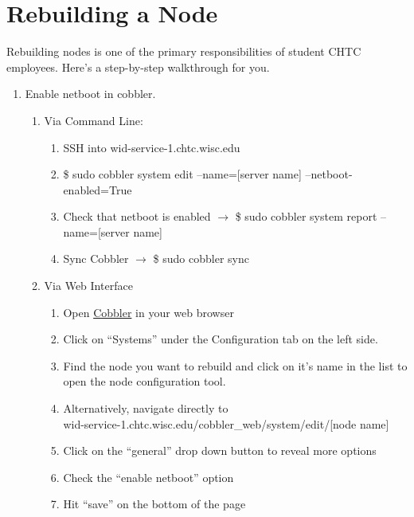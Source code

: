 \documentclass[10pt,letterpaper]{article}
\begin{document}
\clearpage

\section{Rebuilding a Node}
    Rebuilding nodes is one of the primary responsibilities of student CHTC employees.
    Here’s a step-by-step walkthrough for you.

    \begin{enumerate}
        \item Enable netboot in cobbler.
        \begin{enumerate}
            \item Via Command Line:
            \begin{enumerate}
                \item SSH into wid-service-1.chtc.wisc.edu
                \item {\selectfont \$ sudo cobbler system edit
                --name=[server name] --netboot-enabled=True }
                \item Check that netboot is enabled $\rightarrow$
                {\selectfont \$ sudo cobbler system report
                --name=[server name] }
                \item Sync Cobbler $\rightarrow$ {\selectfont
                \$ sudo cobbler sync }
            \end{enumerate}
            \item Via Web Interface
            \begin{enumerate}
                \item Open \href{https://wid-service-1.chtc.wisc.edu/cobbler_web}{Cobbler}
                in your web browser
                \item Click on “Systems” under the Configuration tab on the left side.
                \item Find the node you want to rebuild and click on it’s name in
                the list to open the node configuration tool.
                \item Alternatively, navigate directly to \\
                wid-service-1.chtc.wisc.edu/cobbler\_web/system/edit/[node name]
                \item Click on the “general” drop down button to reveal more options
                \item Check the “enable netboot” option
                \item Hit “save” on the bottom of the page

\end{enumerate}
\end{enumerate}
\end{enumerate}
\end{document}
